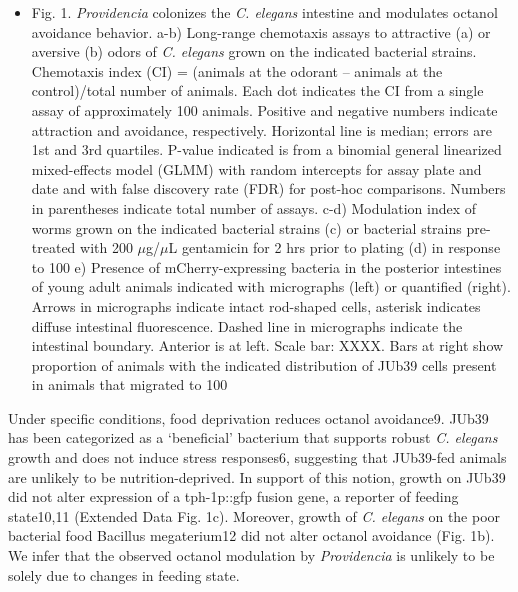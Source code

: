 \documentclass[]{article}
\begin{document}
\begin{itemize}
  \item[] Fig. 1. \textit{Providencia} colonizes the \textit{C. elegans} intestine and modulates octanol avoidance behavior.
a-b) Long-range chemotaxis assays to attractive (a) or aversive (b) odors of \textit{C. elegans} grown on the indicated bacterial strains. Chemotaxis index (CI) = (animals at the odorant – animals at the control)/total number of animals. Each dot indicates the CI from a single assay of approximately 100 animals. Positive and negative numbers indicate attraction and avoidance, respectively. Horizontal line is median; errors are 1st and 3rd quartiles. P-value indicated is from a binomial general linearized mixed-effects model (GLMM) with random intercepts for assay plate and date and with false discovery rate (FDR) for post-hoc comparisons. Numbers in parentheses indicate total number of assays.
c-d) Modulation index of worms grown on the indicated bacterial strains (c) or bacterial strains pre-treated with 200 \(\mu\)g/\(\mu\)L gentamicin for 2 hrs prior to plating (d) in response to 100%
e) Presence of mCherry-expressing bacteria in the posterior intestines of young adult animals indicated with micrographs (left) or quantified (right). Arrows in micrographs indicate intact rod-shaped cells, asterisk indicates diffuse intestinal fluorescence. Dashed line in micrographs indicate the intestinal boundary. Anterior is at left. Scale bar: XXXX. Bars at right show proportion of animals with the indicated distribution of JUb39 cells present in animals that migrated to 100%
\end{itemize}

Under specific conditions, food deprivation reduces octanol avoidance9.
JUb39 has been categorized as a `beneficial' bacterium that supports
robust \textit{C. elegans} growth and does not induce stress responses6,
suggesting that JUb39-fed animals are unlikely to be nutrition-deprived.
In support of this notion, growth on JUb39 did not alter expression of a
tph-1p::gfp fusion gene, a reporter of feeding state10,11 (Extended Data
Fig. 1c). Moreover, growth of \textit{C. elegans} on the poor bacterial
food Bacillus megaterium12 did not alter octanol avoidance (Fig. 1b). We
infer that the observed octanol modulation by \textit{Providencia} is
unlikely to be solely due to changes in feeding state.
\end{document}
